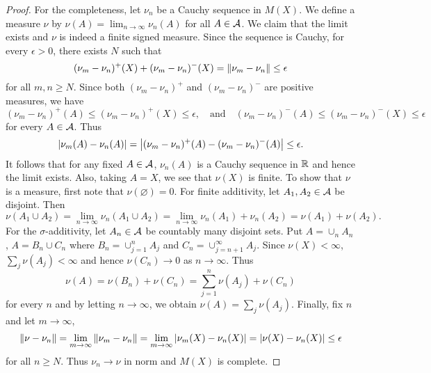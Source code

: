 \begin{proof}
    For the completeness, let $\nu_n$ be a Cauchy sequence in $M(X)$. We 
    define a measure $\nu$ by $\nu(A) = \lim_{n\to\infty} \nu_n(A)$ for 
    all $A\in\mathcal{A}$. We claim that the limit exists and $\nu$ is indeed a 
    finite signed measure. Since the sequence is Cauchy, for every 
    $\epsilon>0$, there exists $N$ such that
    \begin{equation*}
        (\nu_m-\nu_n)^+(X) + (\nu_m-\nu_n)^-(X) = \left\lVert {\nu_m-\nu_n} \right\rVert \leq \epsilon
    \end{equation*}
    for all $m,n\geq N$. Since both $(\nu_m-\nu_n)^+$ and $(\nu_m-\nu_n)^-$ 
    are positive measures, we have 
    \begin{equation*}
        (\nu_m-\nu_n)^+(A) \leq (\nu_m-\nu_n)^+(X) \leq \epsilon, 
        \quad \text{and} \quad 
        (\nu_m-\nu_n)^-(A) \leq (\nu_m-\nu_n)^-(X) \leq \epsilon
    \end{equation*}
    for every $A\in\mathcal{A}$. Thus 
    \begin{equation*}
        \left\lvert {\nu_m(A)-\nu_n(A)} \right\rvert = \left\lvert {(\nu_m-\nu_n)^+(A)-(\nu_m-\nu_n)^-(A)} \right\rvert \leq \epsilon.
    \end{equation*}
    It follows that for any fixed $A\in\mathcal{A}$, $\nu_n(A)$ is a Cauchy 
    sequence in $\mathbb{R}$ and hence the limit exists. Also, taking 
    $A = X$, we see that $\nu(X)$ is finite. To show that $\nu$ is 
    a measure, first note that $\nu(\varnothing) = 0$. For finite 
    additivity, let $A_1,A_2\in\mathcal{A}$ be disjoint. Then 
    \begin{equation*}
        \nu(A_1\cup A_2) = \lim_{n\to\infty} \nu_n(A_1\cup A_2) 
        = \lim_{n\to\infty} \nu_n(A_1) + \nu_n(A_2) = \nu(A_1) + \nu(A_2).
    \end{equation*}
    For the $\sigma$-additivity, let $A_n\in\mathcal{A}$ be countably many 
    disjoint sets. Put $A = \cup_n A_n$, $A = B_n\cup C_n$ where 
    $B_n = \cup_{j=1}^{n} A_j$ and $C_n = \cup_{j=n+1}^{\infty} A_j$. 
    Since $\nu(X)<\infty$, $\sum_j \nu(A_j)<\infty$ and hence 
    $\nu(C_n)\to 0$ as $n\to\infty$. Thus 
    \begin{equation*}
        \nu(A) = \nu(B_n) + \nu(C_n) = \sum_{j=1}^{n}\nu(A_j) + \nu(C_n) 
    \end{equation*}
    for every $n$ and by letting $n\to\infty$, we obtain
    $\nu(A) = \sum_j \nu(A_j)$. Finally, fix $n$ and let $m\to\infty$, 
    \begin{equation*}
        \left\lVert {\nu-\nu_n} \right\rVert = \lim_{m\to\infty} \left\lVert {\nu_m-\nu_n} \right\rVert 
        = \lim_{m\to\infty} \left\lvert {\nu_m(X) - \nu_n(X)} \right\rvert = \left\lvert {\nu(X) - \nu_n(X)} \right\rvert 
        \leq \epsilon
    \end{equation*}
    for all $n\geq N$. Thus $\nu_n\to\nu$ in norm and $M(X)$ is complete.
\end{proof}

